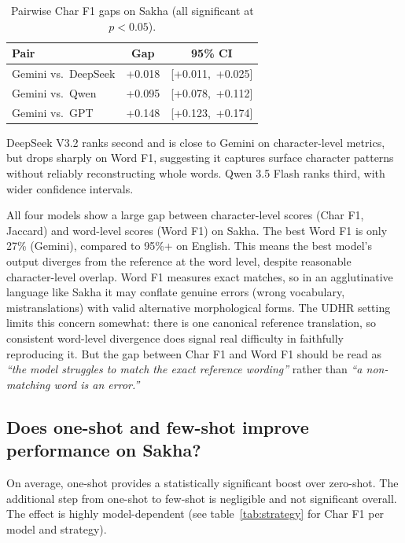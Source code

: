 \documentclass[11pt]{article}
\begin{document}
\begin{table}[ht]
    \centering
    \caption{Pairwise Char F1 gaps on Sakha (all significant at $p < 0.05$).}
    \label{tab:pairwise}
    \small
    \begin{tabular}{lcc}
        \toprule
        \textbf{Pair} & \textbf{Gap} & \textbf{95\% CI} \\
        \midrule
        Gemini vs.\ DeepSeek & +0.018 & [+0.011,\ +0.025] \\
        Gemini vs.\ Qwen     & +0.095 & [+0.078,\ +0.112] \\
        Gemini vs.\ GPT      & +0.148 & [+0.123,\ +0.174] \\
        \bottomrule
    \end{tabular}
\end{table}

DeepSeek V3.2 ranks second and is close to Gemini on character-level metrics, but drops sharply on Word F1, suggesting it captures surface character patterns without reliably reconstructing whole words.
Qwen 3.5 Flash ranks third, with wider confidence intervals.

All four models show a large gap between character-level scores (Char F1, Jaccard) and word-level scores (Word F1) on Sakha. The best Word F1 is only 27\% (Gemini), compared to 95\%+ on English.
This means the best model's output diverges from the reference at the word level, despite reasonable character-level overlap.
Word F1 measures exact matches, so in an agglutinative language like Sakha it may conflate genuine errors (wrong vocabulary, mistranslations) with valid alternative morphological forms.
The UDHR setting limits this concern somewhat: there is one canonical reference translation, so consistent word-level divergence does signal real difficulty in faithfully reproducing it.
But the gap between Char F1 and Word F1 should be read as \textit{``the model struggles to match the exact reference wording''} rather than \textit{``a non-matching word is an error.''}

\subsection{Does one-shot and few-shot improve performance on Sakha?}

On average, one-shot provides a statistically significant boost over zero-shot. The additional step from one-shot to few-shot is negligible and not significant overall.
The effect is highly model-dependent (see table~\ref{tab:strategy} for Char F1 per model and strategy).
\end{document}
